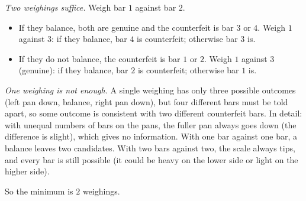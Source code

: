 \emph{Two weighings suffice.} Weigh bar $1$ against bar $2$.
\begin{itemize}
\item If they balance, both are genuine and the counterfeit is bar $3$ or $4$. Weigh $1$ against $3$: if they balance, bar $4$ is counterfeit; otherwise bar $3$ is.
\item If they do not balance, the counterfeit is bar $1$ or $2$. Weigh $1$ against $3$ (genuine): if they balance, bar $2$ is counterfeit; otherwise bar $1$ is.
\end{itemize}
\emph{One weighing is not enough.} A single weighing has only three possible outcomes (left pan down, balance, right pan down), but four different bars must be told apart, so some outcome is consistent with two different counterfeit bars. In detail: with unequal numbers of bars on the pans, the fuller pan always goes down (the difference is slight), which gives no information. With one bar against one bar, a balance leaves two candidates. With two bars against two, the scale always tips, and every bar is still possible (it could be heavy on the lower side or light on the higher side).

So the minimum is $\boxed{2}$ weighings.
